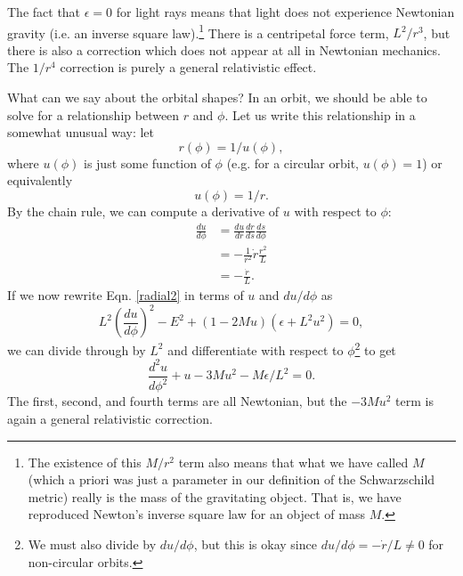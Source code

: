 The fact that $\epsilon=0$ for light rays means that light does not experience Newtonian gravity (i.e. an inverse square law).\footnote{The existence of this $M/r^2$ term also means that what we have called $M$ (which a priori was just a parameter in our definition of the Schwarzschild metric) really is the mass of the gravitating object. That is, we have reproduced Newton's inverse square law for an object of mass $M$.} There is a centripetal force term, $L^2/r^3$, but there is also a correction which does not appear at all in Newtonian mechanics. The $1/r^4$ correction is purely a general relativistic effect.

What can we say about the orbital shapes? In an orbit, we should be able to solve for a relationship between $r$ and $\phi$. Let us write this relationship in a somewhat unusual way: let
$$r(\phi)=1/u(\phi),$$
where $u(\phi)$ is just some function of $\phi$ (e.g. for a circular orbit, $u(\phi)=1$) or equivalently
$$u(\phi)=1/r.$$ 
By the chain rule, we can compute a derivative of $u$ with respect to $\phi$:
\begin{align*}
\frac{du}{d\phi}&= \frac{du}{dr}\frac{dr}{ds}\frac{ds}{d\phi}\\
&= -\frac{1}{r^2} \dot r\frac{r^2}{L}\\
&= -\frac{\dot r}{L}.
\end{align*}
If we now rewrite Eqn. \eqref{radial2} in terms of $u$ and $du/d\phi$ as
$$L^2\left(\frac{du}{d\phi}\right)^2-E^2+(1-2Mu)(\epsilon+L^2u^2)=0,$$
we can divide through by $L^2$ and differentiate with respect to $\phi$\footnote{We must also divide by $du/d\phi$, but this is okay since $du/d\phi=-\dot r/L\neq 0$ for non-circular orbits.} to get
$$\frac{d^2u}{d\phi^2}+u-3Mu^2-M\epsilon/L^2=0.$$
The first, second, and fourth terms are all Newtonian, but the $-3Mu^2$ term is again a general relativistic correction.

